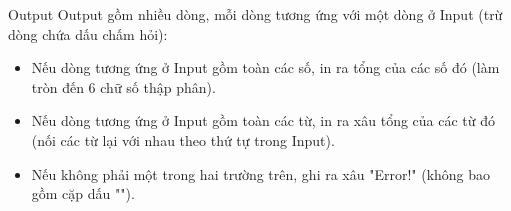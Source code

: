 Output
Output gồm nhiều dòng, mỗi dòng tương ứng với một dòng ở Input (trừ dòng chứa dấu chấm hỏi):  
\begin{itemize}
	\item     Nếu dòng tương ứng ở Input gồm toàn các số, in ra tổng của các số đó (làm tròn đến 6 chữ số thập phân).   
	\item     Nếu dòng tương ứng ở Input gồm toàn các từ, in ra xâu tổng của các từ đó (nối các từ lại với nhau theo thứ tự trong Input).   
	\item     Nếu không phải một trong hai trường trên, ghi ra xâu "Error!" (không bao gồm cặp dấu "").   
\end{itemize}
